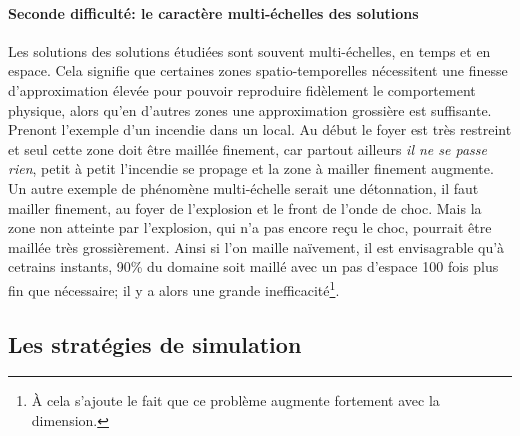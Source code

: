     \paragraph{Seconde difficulté: le caractère multi-échelles des solutions}
        Les solutions des solutions étudiées sont souvent multi-échelles, en temps et en espace. Cela signifie que certaines zones spatio-temporelles nécessitent
        une finesse d'approximation élevée pour pouvoir reproduire fidèlement le comportement physique, alors qu'en d'autres zones une approximation
        grossière est suffisante. Prenont l'exemple d'un incendie dans un local. Au début le foyer est très restreint et seul cette zone doit être maillée finement, 
        car partout ailleurs \textit{il ne se passe rien}, petit à petit l'incendie se propage et la zone à mailler finement augmente. Un autre exemple de phénomène 
        multi-échelle serait une détonnation, il faut mailler finement, au foyer de l'explosion et le front de l'onde de choc. Mais la zone non atteinte par l'explosion, 
        qui n'a pas encore reçu le choc, pourrait être maillée très grossièrement. 
        Ainsi si l'on maille naïvement, il est envisagrable qu'à cetrains instants, 90\% du domaine soit maillé avec un pas d'espace 100 fois plus fin que nécessaire;
        il y a alors une grande inefficacité\footnote{À cela s'ajoute le fait que ce problème augmente fortement avec la dimension.}.


\subsection{Les stratégies de simulation}
